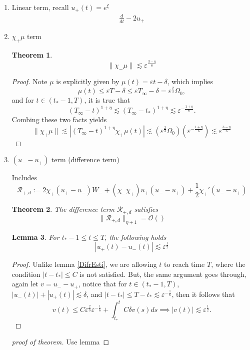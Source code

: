\documentclass[letterpaper,11pt]{article}
\newcommand{\rmO}{\mathcal{O}}
\newcommand{\eps}{\varepsilon}
\newcommand{\lar}{ \lesssim }
\numberwithin{equation}{section}
\theoremstyle{plain}
\newtheorem{theorem}{Theorem}[section]
\newtheorem{lemma}[theorem]{Lemma}
\begin{document}
\begin{itemize}
\begin{enumerate}
\item Linear term, recall $u_+(t) = e^\xi$
\begin{align*}
\frac{d}{dt} - 2u_+
\end{align*}

\item  $\chi_+\mu$ term
\begin{theorem}
\[
\|\chi_- \mu \| \lar \eps ^{\frac{3-\eta}{6}}
\]
\end{theorem}

\begin{proof}Note $\mu$ is explicitly given by $\mu(t) = \eps t -\delta$, which implies
\[
\mu(t)\le   \eps T -\delta \le \eps T_\infty - \delta = \eps^{\frac{2}{3}}\Omega_0,
 \]
 and for $t \in (t_*-1,T)$, it is true that
 \[
 (T_\infty-t)^{1+\eta} \lar (T_\infty - t_*)^{1+\eta} \lar \eps^{-\frac{1+\eta}{6}}.
 \]
Combing these two facts yields
\[
\|\chi_+ \mu \| \lar |(T_\infty -t)^{1+\eta}\chi_+\mu(t) | \lar \left(\eps^{\frac{2}{3}}\Omega_0 \right)\left( \eps^{-\frac{1+\eta}{6}}\right) \lar \eps^{\frac{3-\eta}{6}}
\]
\end{proof}
\item $(u_- - u_+)$ term (difference term)

Includes
\[
\mathcal{R}_{+,d} := 2\chi_+(u_+ - u_-)W_- + (\chi_-\chi_+)u_+(u_- - u_+) + \frac{1}{2}\chi_+'(u_- - u_+)
\]

\begin{theorem}
The difference term $\mathcal{R}_{+,d}$ satisfies
\[
\|\mathcal{R}_{+,d} \|_{\eta+1}  = \rmO()
\]
\end{theorem}

\begin{lemma}
For $t_* -1 \le t \le T$, the following holds
\[
|u_+(t)-u_-(t)| \lar \eps^{\frac{1}{2}}
\]
\end{lemma}
\begin{proof}
Unlike lemma \ref{DifrEsti}, we are allowing $t$ to reach time $T$, where the condition $|t-t_*|\le C$ is not satisfied. But, the same argument goes through, again let $v = u_- -u_+$, notice that for $t \in (t_*-1,T)$, $|u_-(t)|+|u_+(t)| \lar \delta$, and $|t-t_*| \le T-t_* \lar \eps^{-\frac{1}{6}}$, then it follows that
\[
v(t)\le  C\eps^{\frac{2}{3}}\eps^{-\frac{1}{6}} + \int_{t_*}^t C\delta v(s)ds \implies |v(t)| \lar \eps^{\frac{1}{2}}.
\]
\end{proof}

\begin{proof}[proof of theorem]Use lemma


\end{proof}
\end{enumerate}
\end{itemize}
\end{document}

